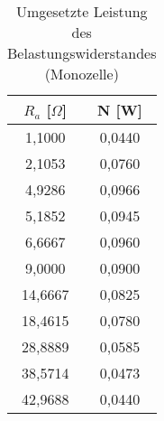 \begin{table}[h]
	\begin{center}
		\begin{tabular}{cc}
			$R_a$ [$\Omega$]&N [W] \\ \hline
			1,1000&0,0440\\ 
			2,1053&0,0760 \\  
			4,9286&0,0966\\
			5,1852&0,0945 \\
			6,6667&0,0960\\
			9,0000&0,0900\\
			14,6667&0,0825 \\
			18,4615&0,0780 \\
			28,8889&0,0585 \\
			38,5714&0,0473 \\
			42,9688&0,0440
			\end{tabular}
		\caption{Umgesetzte Leistung des Belastungswiderstandes (Monozelle)}
		\label{tabe}
	\end{center}
\end{table}